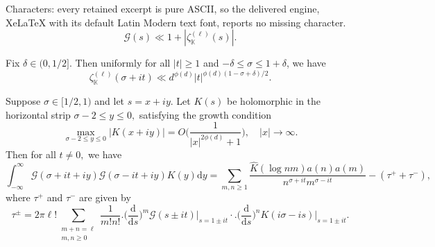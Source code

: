 \documentclass[10pt,a4paper]{amsart}
\newcommand{\mbk}{\mathbb{K}}
\newcommand{\mcg}{\mathcal{G}}
\begin{document}
Characters: every retained excerpt is pure ASCII, so the delivered engine, XeLaTeX with its default Latin Modern text font, reports no missing character.
\begin{equation}
    \label{tirvialupper}
    \mcg(s) \ll 1 + |\zeta_\mbk^{(\ell)}(s)|.
\end{equation}

\begin{lem}
    \label{approximatededekind}
    Fix $\delta \in (0, 1/2]$. Then uniformly for all $|t| \ge 1$ and $-\delta \le \sigma \le 1+\delta$, we have
    $$
    \zeta_\mbk^{(\ell)} ( \sigma + it) \ll d^{\phi(d)}|t| ^{\phi(d)(1-\sigma+\delta)/2}.
    $$
\end{lem}

\begin{lem}
    	\label{convolutionformula}
      Suppose $\sigma \in [1/2, 1)$ and let $s = x + iy$. Let $K(s)$ be holomorphic in the horizontal strip $\sigma-2 \le y \le 0,$ satisfying the growth condition
     $$
     \max_{\sigma-2\le y \le 0}|K(x+iy)|=O\Big(\frac{1}{|x|^{2 \phi(d)} + 1}\Big), \quad |x| \to \infty.
     $$
     Then for all $t \neq 0,$ we have
     $$
     \int_{-\infty}^{\infty} \mcg(\sigma + it + iy)\mcg(\sigma - it + iy)K(y)\mathrm{d}y = \sum_{m,n\ge1} \frac{\widehat{K}(\log nm) a(n)a(m)}{n^{\sigma + it} m^{\sigma - it}}  - (\tau^{+} + \tau^{-}),
     $$
     where $\tau^{+}$ and $\tau^{-}$ are given by
     $$
     \tau^\pm = 2\pi \ell!\sum_{\substack{m + n = \ell \\ m,n\ge 0}} \frac{1}{m!n!} \Big. \Big( \frac{\mathrm{d}}{\mathrm{d}s} \Big)^m \mcg(s \pm it) \Big|_{s = 1 \pm it} \cdot \Big. \Big( \frac{\mathrm{d}}{\mathrm{d}s} \Big)^n K(i\sigma - is) \Big|_{s = 1 \pm it}.
     $$
\end{lem}
\end{document}
